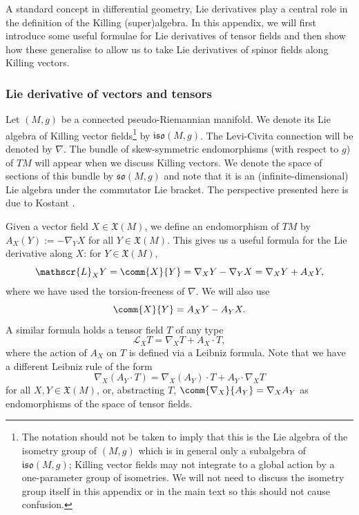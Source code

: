 \documentclass[10pt,a4paper]{amsart}
\numberwithin{equation}{section}
\newcommand{\fso}{\mathfrak{so}}
\newcommand{\fiso}{\mathfrak{iso}}
\newcommand{\fX}{\mathfrak{X}}
\newcommand{\eL}{\mathscr{L}}
\newcommand{\1}{\mathbbm{1}}
\begin{document}
A standard concept in differential geometry, Lie derivatives play a central role in the definition of the Killing (super)algebra. In this appendix, we will first introduce some useful formulae for Lie derivatives of tensor fields and then show how these generalise to allow us to take Lie derivatives of spinor fields along Killing vectors.

\subsubsection{Lie derivative of vectors and tensors}
\label{sec:lei-der-vector-tensor}

Let $(M,g)$ be a connected pseudo-Riemannian manifold. We denote its Lie algebra of Killing vector fields\footnote{The notation should not be taken to imply that this is the Lie algebra of the isometry group of $(M,g)$ which is in general only a subalgebra of $\fiso(M,g)$; Killing vector fields may not integrate to a global action by a one-parameter group of isometries. We will not need to discuss the isometry group itself in this appendix or in the main text so this should not cause confusion.}
by $\fiso(M,g)$. The Levi-Civita connection will be denoted by $\nabla$. The bundle of skew-symmetric endomorphisms (with respect to $g$) of $TM$ will appear when we discuss Killing vectors. We denote the space of sections of this bundle by $\fso(M,g)$ and note that it is an (infinite-dimensional) Lie algebra under the commutator Lie bracket. The perspective presented here is due to Kostant \cite{Kostant1955}.

Given a vector field $X\in\fX(M)$, we define an endomorphism of $TM$ by
$A_X(Y) := -\nabla_Y X
$
for all $Y\in\fX(M)$. This gives us a useful formula for the Lie derivative along $X$: for $Y\in\fX(M)$,
\begin{equation}\label{eq:lie-der-vec-formula}
	\eL_X Y = \comm{X}{Y} = \nabla_X Y - \nabla_Y X = \nabla_X Y + A_X Y,
\end{equation}
where we have used the torsion-freeness of $\nabla$. We will also use
\begin{equation}\label{eq:comm-formula}
	\comm{X}{Y} = A_X Y - A_Y X.
\end{equation}
A similar formula holds a tensor field $T$ of any type
\begin{equation}\label{eq:lie-der-tensor-formula}
	\eL_X T = \nabla_X T + A_X \cdot T,
\end{equation}
where the action of $A_X$ on $T$ is defined via a Leibniz formula. Note that we have a different Leibniz rule of the form
\[
	\nabla_X (A_Y\cdot T) = \nabla_X(A_Y)\cdot T + A_Y\cdot\nabla_X T
\]
for all $X,Y\in\fX(M)$, or, abstracting $T$, $\comm{\nabla_X}{A_Y}=\nabla_X A_Y$ as endomorphisms of the space of tensor fields.
\end{document}
